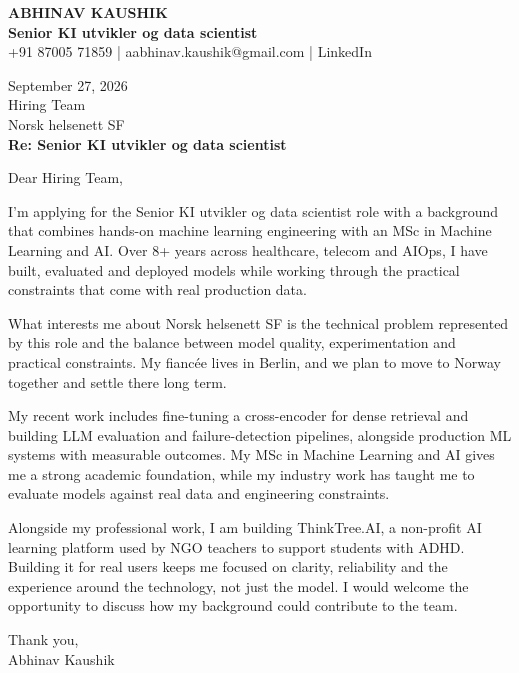 \documentclass[10pt,a4paper]{article}
\begin{document}
\begin{center}
{\Large\bfseries ABHINAV KAUSHIK}\\[2pt]
{\bfseries Senior KI utvikler og data scientist}\\[2pt]
+91 87005 71859 \quad | \quad aabhinav.kaushik@gmail.com \quad | \quad LinkedIn
\end{center}
\vspace{8pt}
September 27, 2026\\[6pt]
Hiring Team\\
Norsk helsenett SF\\[4pt]
\textbf{Re: Senior KI utvikler og data scientist}

Dear Hiring Team,

I’m applying for the Senior KI utvikler og data scientist role with a background that combines hands-on machine learning engineering with an MSc in Machine Learning and AI. Over 8+ years across healthcare, telecom and AIOps, I have built, evaluated and deployed models while working through the practical constraints that come with real production data.

What interests me about Norsk helsenett SF is the technical problem represented by this role and the balance between model quality, experimentation and practical constraints. My fiancée lives in Berlin, and we plan to move to Norway together and settle there long term.

My recent work includes fine-tuning a cross-encoder for dense retrieval and building LLM evaluation and failure-detection pipelines, alongside production ML systems with measurable outcomes. My MSc in Machine Learning and AI gives me a strong academic foundation, while my industry work has taught me to evaluate models against real data and engineering constraints.

Alongside my professional work, I am building ThinkTree.AI, a non-profit AI learning platform used by NGO teachers to support students with ADHD. Building it for real users keeps me focused on clarity, reliability and the experience around the technology, not just the model. I would welcome the opportunity to discuss how my background could contribute to the team.

Thank you,\\
Abhinav Kaushik
\end{document}

